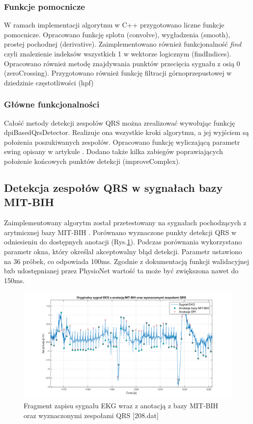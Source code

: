 \documentclass[a4paper,10pt]{article} %
\begin{document}
\subsubsection{Funkcje pomocnicze}
W ramach implementacji algorytmu w C++ przygotowano liczne funkcje pomocnicze. Opracowano funkcję splotu (convolve), wygładzenia (smooth), prostej pochodnej (derivative). Zaimplementowano również funkcjonalność  \textit{find} czyli znalezienie indeksów wszystkich 1 w wektorze logicznym (findIndices). Opracowano również metodę znajdywania punktów przecięcia sygnału z osią 0 (zeroCrossing). Przygotowano również funkcję filtracji górnoprzepustowej w dziedzinie częstotliwości (hpf)

\subsubsection{Główne funkcjonalności}
Całość metody detekcji zespołów QRS można zrealizować wywołując funkcję dpiBasedQrsDetector. Realizuje ona wszystkie kroki algorytmu, a jej wyjściem są położenia poszukiwanych zespołów. Opracowano funkcję wyliczającą parametr swing opisany w artykule \cite{dpi}. Dodano także kilka zabiegów poprawiających położenie końcowych punktów detekcji (improveComplex). 
\newpage
\subsection{Detekcja zespołów QRS w sygnałach bazy MIT-BIH} 
Zaimplementowany algorytm został przetestowany na sygnałach pochodzących z arytmicznej bazy MIT-BIH \cite{PhysioNet}. Porównano wyznaczone punkty detekcji QRS w odniesieniu do dostępnych anotacji (Rys.\ref{208img}). Podczas porównania wykorzystano parametr okna, który określał akceptowalny błąd detekcji. Parametr ustawiono na 36 próbek, co odpowiada 100ms. Zgodnie z dokumentacją funkcji walidacyjnej bxb udostępnianej przez PhysioNet wartość ta może być zwiększona nawet do 150ms. 
\begin{figure}[h]
    \centering
    \includegraphics[width=1\textwidth]{img/208.png}
    \caption{Fragment zapisu sygnału EKG wraz z anotacją z bazy MIT-BIH oraz wyznaczonymi zespołami QRS [208.dat]}
    \label{208img}
\end{figure}
\FloatBarrier
\end{document}

